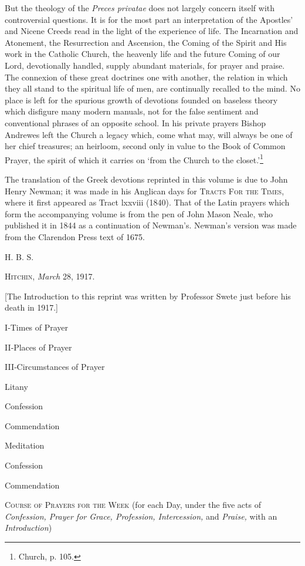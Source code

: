 But the theology of the \emph{Preces privatae} does not largely concern itself with controversial questions. It is for the most part an interpretation of the Apostles’ and Nicene Creeds read in the light of the experience of life. The Incarnation and Atonement, the Resurrection and Ascension, the Coming of the Spirit and His work in the Catholic Church, the heavenly life and the future Coming of our Lord, devotionally handled, supply abundant materials, for prayer and praise. The connexion of these great doctrines one with another, the relation in which they all stand to the spiritual life of men, are continually recalled to the mind. No place is left for the spurious growth of devotions founded on baseless theory which disfigure many modern manuals, not for the false sentiment and conventional phrases of an opposite school. In his private prayers Bishop Andrewes left the Church a legacy which, come what may, will always be one of her chief treasures; an heirloom, second only in value to the Book of Common Prayer, the spirit of which it carries on ‘from the Church to the closet.’\footnote{Church, p. 105.}

The translation of the Greek devotions reprinted in this volume is due to John Henry Newman; it was made in his Anglican days for \textsc{Tracts For the Times}, where it first appeared as  Tract lxxviii (1840). That of the Latin prayers which form the accompanying volume is from the pen of John Mason Neale, who published it in 1844 as a continuation of Newman’s. Newman’s version was made from the Clarendon Press text of 1675.

H. B. S.

\textsc{Hitchin}, \emph{March} 28, 1917.

[The Introduction to this reprint was written by Professor Swete just before his death in 1917.]


I‑Times of Prayer

II‑Places of Prayer

III‑Circumstances of Prayer

Litany

Confession

Commendation

Meditation

Confession

Commendation

\textsc{Course of Prayers for the Week} (for each Day, under the five acts of \emph{Confession, Prayer for Grace, Profession, Intercession, }and \emph{Praise, }with an \emph{Introduction})

